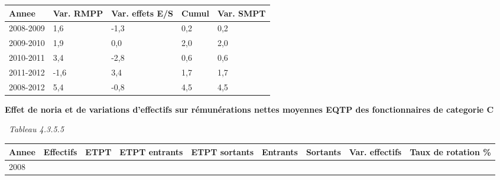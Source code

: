 \begin{longtable}[]{@{}lllll@{}}
\toprule
Annee & Var. RMPP & Var. effets E/S & Cumul & Var. SMPT\tabularnewline
\midrule
\endhead
2008-2009 & 1,6 & -1,3 & 0,2 & 0,2\tabularnewline
2009-2010 & 1,9 & 0,0 & 2,0 & 2,0\tabularnewline
2010-2011 & 3,4 & -2,8 & 0,6 & 0,6\tabularnewline
2011-2012 & -1,6 & 3,4 & 1,7 & 1,7\tabularnewline
2008-2012 & 5,4 & -0,8 & 4,5 & 4,5\tabularnewline
\bottomrule
\end{longtable}

\textbf{Effet de noria et de variations d'effectifs sur rémunérations
nettes moyennes EQTP des fonctionnaires de categorie C}

~\emph{Tableau 4.3.5.5}

\begin{longtable}[]{@{}lllllllll@{}}
\toprule
\begin{minipage}[b]{0.05\columnwidth}\raggedright
Annee\strut
\end{minipage} & \begin{minipage}[b]{0.08\columnwidth}\raggedright
Effectifs\strut
\end{minipage} & \begin{minipage}[b]{0.05\columnwidth}\raggedright
ETPT\strut
\end{minipage} & \begin{minipage}[b]{0.10\columnwidth}\raggedright
ETPT entrants\strut
\end{minipage} & \begin{minipage}[b]{0.10\columnwidth}\raggedright
ETPT sortants\strut
\end{minipage} & \begin{minipage}[b]{0.07\columnwidth}\raggedright
Entrants\strut
\end{minipage} & \begin{minipage}[b]{0.07\columnwidth}\raggedright
Sortants\strut
\end{minipage} & \begin{minipage}[b]{0.11\columnwidth}\raggedright
Var. effectifs\strut
\end{minipage} & \begin{minipage}[b]{0.14\columnwidth}\raggedright
Taux de rotation \%\strut
\end{minipage}\tabularnewline
\midrule
\endhead
\begin{minipage}[t]{0.05\columnwidth}\raggedright
2008\strut
\end{minipage} & \begin{minipage}[t]{0.08\columnwidth}\raggedright

\end{minipage}
\end{longtable}
